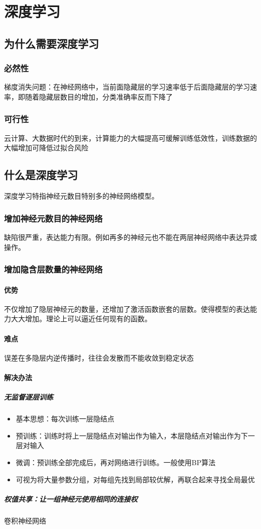 \documentclass[UTF8]{ctexart}
\begin{document}
\newpage
\section{深度学习}
\subsection{为什么需要深度学习}
\subsubsection{必然性}
梯度消失问题：在神经网络中，当前面隐藏层的学习速率低于后面隐藏层的学习速率，即随着隐藏层数目的增加，分类准确率反而下降了
\subsubsection{可行性}
云计算、大数据时代的到来，计算能力的大幅提高可缓解训练低效性，训练数据的大幅增加可降低过拟合风险

\subsection{什么是深度学习}
深度学习特指神经元数目特别多的神经网络模型。
\subsubsection{增加神经元数目的神经网络}
缺陷很严重，表达能力有限。例如再多的神经元也不能在两层神经网络中表达异或操作。
\subsubsection{增加隐含层数量的神经网络}
\paragraph{优势}
不仅增加了隐层神经元的数量，还增加了激活函数嵌套的层数。使得模型的表达能力大大增加。理论上可以逼近任何现有的函数。
\paragraph{难点}
误差在多隐层内逆传播时，往往会发散而不能收敛到稳定状态
\paragraph{解决办法}
\subparagraph{无监督逐层训练}
\begin{itemize}
	\item 基本思想：每次训练一层隐结点
    \item 预训练：训练时将上一层隐结点对输出作为输入，本层隐结点对输出作为下一层对输入
    \item 微调：预训练全部完成后，再对网络进行训练。一般使用BP算法
    \item 可视为将大量参数分组，对每组先找到局部较优解，再联合起来寻找全局最优
\end{itemize}
\subparagraph{权值共享：让一组神经元使用相同的连接权}
卷积神经网络
\end{document}
